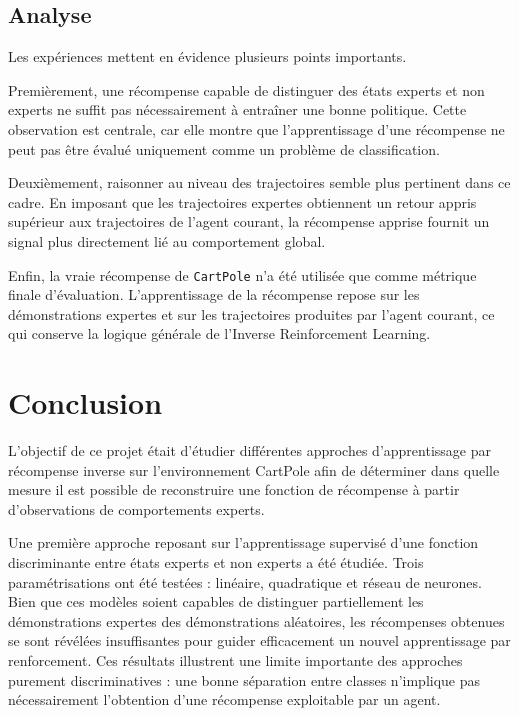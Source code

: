 \subsection{Analyse}

Les expériences mettent en évidence plusieurs points importants.

Premièrement, une récompense capable de distinguer des états experts et non experts ne suffit pas nécessairement à entraîner une bonne politique. Cette observation est centrale, car elle montre que l’apprentissage d’une récompense ne peut pas être évalué uniquement comme un problème de classification.

Deuxièmement, raisonner au niveau des trajectoires semble plus pertinent dans ce cadre. En imposant que les trajectoires expertes obtiennent un retour appris supérieur aux trajectoires de l’agent courant, la récompense apprise fournit un signal plus directement lié au comportement global.

Enfin, la vraie récompense de \texttt{CartPole} n’a été utilisée que comme métrique finale d’évaluation. L’apprentissage de la récompense repose sur les démonstrations expertes et sur les trajectoires produites par l’agent courant, ce qui conserve la logique générale de l’Inverse Reinforcement Learning.

\section{Conclusion}

L'objectif de ce projet était d'étudier différentes approches d'apprentissage par récompense inverse sur l'environnement CartPole afin de déterminer dans quelle mesure il est possible de reconstruire une fonction de récompense à partir d'observations de comportements experts.

Une première approche reposant sur l'apprentissage supervisé d'une fonction discriminante entre états experts et non experts a été étudiée. Trois paramétrisations ont été testées : linéaire, quadratique et réseau de neurones. Bien que ces modèles soient capables de distinguer partiellement les démonstrations expertes des démonstrations aléatoires, les récompenses obtenues se sont révélées insuffisantes pour guider efficacement un nouvel apprentissage par renforcement. Ces résultats illustrent une limite importante des approches purement discriminatives : une bonne séparation entre classes n'implique pas nécessairement l'obtention d'une récompense exploitable par un agent.

